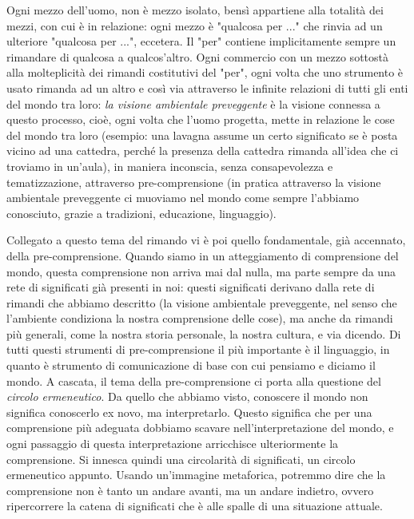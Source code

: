 \documentclass[a4paper,12pt,oneside]{article}%
\begin{document}
Ogni mezzo dell'uomo, non è mezzo isolato, bensì appartiene alla totalità dei mezzi, con cui è in relazione: ogni mezzo è "qualcosa per ..." che rinvia ad un ulteriore "qualcosa per ...", eccetera. Il "per" contiene implicitamente sempre un rimandare di qualcosa a qualcos'altro. Ogni commercio con un mezzo sottostà alla molteplicità dei rimandi costitutivi del "per", ogni volta che uno strumento è usato rimanda ad un altro e così via attraverso le infinite relazioni di tutti gli enti del mondo tra loro: \textit{la visione ambientale preveggente} è la visione connessa a questo processo, cioè, ogni volta che l'uomo progetta, mette in relazione le cose del mondo tra loro (esempio: una lavagna assume un certo significato se è posta vicino ad una cattedra, perché la presenza della cattedra rimanda all’idea che ci troviamo in un’aula), in maniera inconscia, senza consapevolezza e tematizzazione, attraverso pre-comprensione (in pratica attraverso la visione ambientale preveggente ci muoviamo nel mondo come sempre l'abbiamo conosciuto, grazie a tradizioni, educazione, linguaggio).

Collegato a questo tema del rimando vi è poi quello fondamentale, già accennato, della pre-comprensione. Quando siamo in un atteggiamento di comprensione del mondo, questa comprensione non arriva mai dal nulla, ma parte sempre da una rete di significati già presenti in noi: questi significati derivano dalla rete di rimandi che abbiamo descritto (la visione ambientale preveggente, nel senso che l’ambiente condiziona la nostra comprensione delle cose), ma anche da rimandi più generali, come la nostra storia personale, la nostra cultura, e via dicendo. Di tutti questi strumenti di pre-comprensione il più importante è il linguaggio, in quanto è strumento di comunicazione di base con cui pensiamo e diciamo il mondo. A cascata,  il tema della pre-comprensione ci porta alla questione del \textit{circolo ermeneutico}. Da quello che abbiamo visto, conoscere il mondo non significa conoscerlo ex novo, ma interpretarlo. Questo significa che per una comprensione più adeguata dobbiamo scavare nell’interpretazione del mondo, e ogni passaggio di questa interpretazione arricchisce ulteriormente la comprensione. Si innesca quindi una circolarità di significati, un circolo ermeneutico appunto. Usando un’immagine metaforica, potremmo dire che la comprensione non è tanto un andare avanti, ma un andare indietro, ovvero ripercorrere la catena di significati che è alle spalle di una situazione attuale.
\end{document}
